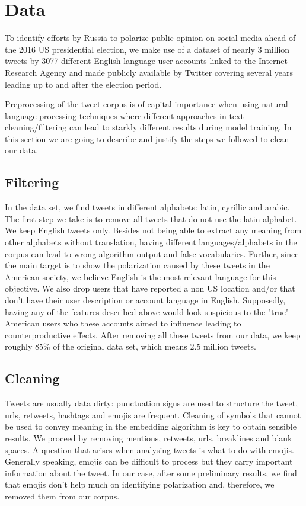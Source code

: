 \documentclass[12pt, authoryear]{elsarticle}
\begin{document}
\section{Data}
To identify efforts by Russia to polarize public opinion on social media ahead of the 2016 US presidential election, we make use of a dataset of nearly 3 million tweets by 3077 different English-language user accounts linked to the Internet Research Agency and made publicly available by Twitter covering several years leading up to and after the election period.

Preprocessing of the tweet corpus is of capital importance when using natural language processing techniques where different approaches in text cleaning/filtering can lead to starkly different results during model training. In this section we are going to describe and justify the steps we followed to clean our data.

\subsection{Filtering}

In the data set, we find tweets in different alphabets: latin, cyrillic and arabic. The first step we take is to remove all tweets that do not use the latin alphabet. We keep English tweets only. Besides not being able to extract any meaning from other alphabets without translation, having different languages/alphabets in the corpus can lead to wrong algorithm output and false vocabularies. Further, since the main target is to show the polarization caused by these tweets in the American society, we believe English is the most relevant language for this objective. We also drop users that have reported a non US location and/or that don't have their user description or account language in English. Supposedly, having any of the features described above would look suspicious to the "true" American users who these accounts aimed to influence leading to counterproductive effects. After removing all these tweets from our data, we keep roughly 85\% of the original data set, which means 2.5 million tweets.

\subsection{Cleaning}

Tweets are usually data dirty: punctuation signs are used to structure the tweet, urls, retweets, hashtags and emojis are frequent. Cleaning of symbols that cannot be used to convey meaning in the embedding algorithm is key to obtain sensible results. We proceed by removing mentions, retweets, urls, breaklines and  blank spaces. A question that arises when analysing tweets is what to do with emojis. Generally speaking, emojis can be difficult to process but they carry important information about the tweet. In our case, after some preliminary results, we find that emojis don't help much on identifying polarization and, therefore, we removed them from our corpus.
\end{document}
